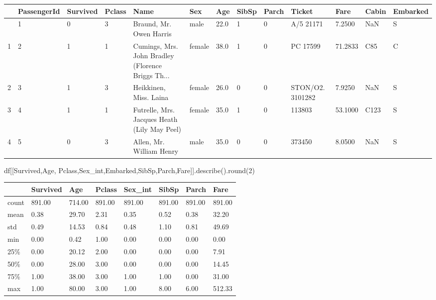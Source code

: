 \documentclass[
  letterpaper,
  DIV=11,
  numbers=noendperiod]{scrreprt}
\newenvironment{Shaded}{\begin{snugshade}}{\end{snugshade}}
\newcommand{\BuiltInTok}[1]{\textcolor[rgb]{0.00,0.23,0.31}{#1}}
\newcommand{\DecValTok}[1]{\textcolor[rgb]{0.68,0.00,0.00}{#1}}
\newcommand{\NormalTok}[1]{\textcolor[rgb]{0.00,0.23,0.31}{#1}}
\newcommand{\StringTok}[1]{\textcolor[rgb]{0.13,0.47,0.30}{#1}}
\begin{document}
\begin{longtable}[]{@{}lllllllllllll@{}}
\toprule\noalign{}
& PassengerId & Survived & Pclass & Name & Sex & Age & SibSp & Parch &
Ticket & Fare & Cabin & Embarked \\
\midrule\noalign{}
\endhead
\bottomrule\noalign{}
\endlastfoot
0 & 1 & 0 & 3 & Braund, Mr. Owen Harris & male & 22.0 & 1 & 0 & A/5
21171 & 7.2500 & NaN & S \\
1 & 2 & 1 & 1 & Cumings, Mrs. John Bradley (Florence Briggs Th... &
female & 38.0 & 1 & 0 & PC 17599 & 71.2833 & C85 & C \\
2 & 3 & 1 & 3 & Heikkinen, Miss. Laina & female & 26.0 & 0 & 0 &
STON/O2. 3101282 & 7.9250 & NaN & S \\
3 & 4 & 1 & 1 & Futrelle, Mrs. Jacques Heath (Lily May Peel) & female &
35.0 & 1 & 0 & 113803 & 53.1000 & C123 & S \\
4 & 5 & 0 & 3 & Allen, Mr. William Henry & male & 35.0 & 0 & 0 & 373450
& 8.0500 & NaN & S \\
\end{longtable}

\begin{Shaded}
\begin{Highlighting}[]
\NormalTok{df[[}\StringTok{\textquotesingle{}Survived\textquotesingle{}}\NormalTok{,}\StringTok{\textquotesingle{}Age\textquotesingle{}}\NormalTok{, }\StringTok{\textquotesingle{}Pclass\textquotesingle{}}\NormalTok{,}\StringTok{\textquotesingle{}Sex\_int\textquotesingle{}}\NormalTok{,}\StringTok{\textquotesingle{}Embarked\textquotesingle{}}\NormalTok{,}\StringTok{\textquotesingle{}SibSp\textquotesingle{}}\NormalTok{,}\StringTok{\textquotesingle{}Parch\textquotesingle{}}\NormalTok{,}\StringTok{\textquotesingle{}Fare\textquotesingle{}}\NormalTok{]].describe().}\BuiltInTok{round}\NormalTok{(}\DecValTok{2}\NormalTok{)}
\end{Highlighting}
\end{Shaded}

\begin{longtable}[]{@{}llllllll@{}}
\toprule\noalign{}
& Survived & Age & Pclass & Sex\_int & SibSp & Parch & Fare \\
\midrule\noalign{}
\endhead
\bottomrule\noalign{}
\endlastfoot
count & 891.00 & 714.00 & 891.00 & 891.00 & 891.00 & 891.00 & 891.00 \\
mean & 0.38 & 29.70 & 2.31 & 0.35 & 0.52 & 0.38 & 32.20 \\
std & 0.49 & 14.53 & 0.84 & 0.48 & 1.10 & 0.81 & 49.69 \\
min & 0.00 & 0.42 & 1.00 & 0.00 & 0.00 & 0.00 & 0.00 \\
25\% & 0.00 & 20.12 & 2.00 & 0.00 & 0.00 & 0.00 & 7.91 \\
50\% & 0.00 & 28.00 & 3.00 & 0.00 & 0.00 & 0.00 & 14.45 \\
75\% & 1.00 & 38.00 & 3.00 & 1.00 & 1.00 & 0.00 & 31.00 \\
max & 1.00 & 80.00 & 3.00 & 1.00 & 8.00 & 6.00 & 512.33 \\
\end{longtable}
\end{document}
